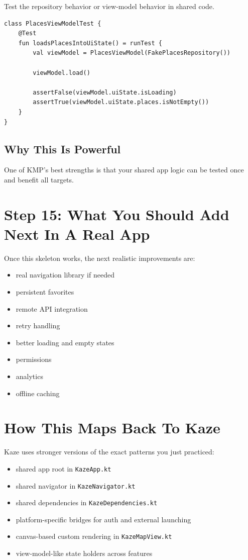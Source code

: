 \documentclass[11pt,a4paper]{article}
\begin{document}
Test the repository behavior or view-model behavior in shared code.

\begin{lstlisting}[style=kazekotlin]
class PlacesViewModelTest {
    @Test
    fun loadsPlacesIntoUiState() = runTest {
        val viewModel = PlacesViewModel(FakePlacesRepository())

        viewModel.load()

        assertFalse(viewModel.uiState.isLoading)
        assertTrue(viewModel.uiState.places.isNotEmpty())
    }
}
\end{lstlisting}

\subsection{Why This Is Powerful}

One of KMP's best strengths is that your shared app logic can be tested once and benefit all targets.

\section{Step 15: What You Should Add Next In A Real App}

Once this skeleton works, the next realistic improvements are:
\begin{itemize}
    \item real navigation library if needed
    \item persistent favorites
    \item remote API integration
    \item retry handling
    \item better loading and empty states
    \item permissions
    \item analytics
    \item offline caching
\end{itemize}

\section{How This Maps Back To Kaze}

Kaze uses stronger versions of the exact patterns you just practiced:
\begin{itemize}
    \item shared app root in \texttt{KazeApp.kt}
    \item shared navigator in \texttt{KazeNavigator.kt}
    \item shared dependencies in \texttt{KazeDependencies.kt}
    \item platform-specific bridges for auth and external launching
    \item canvas-based custom rendering in \texttt{KazeMapView.kt}
    \item view-model-like state holders across features
\end{itemize}
\end{document}
